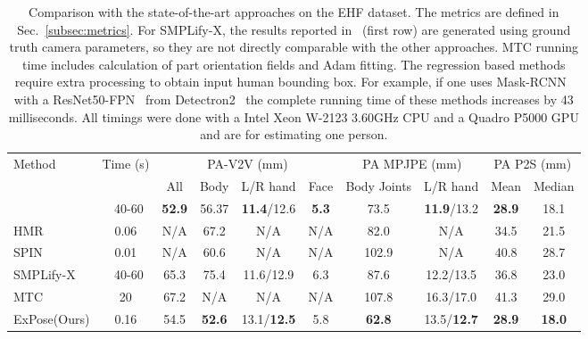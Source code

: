 \documentclass[runningheads]{llncs}
\newcommand{\modelname}{\mbox{ExPose}\xspace}
\newcommand{\na}{\mbox{N/A}\xspace}
\newcommand{\smplifyx}{\mbox{SMPLify-X}\xspace}
\newcommand{\fpn}{\mbox{FPN}\xspace}
\newcommand{\detectron}{\mbox{Detectron2}\xspace}
\newcommand{\adam}{\mbox{Adam}\xspace}
\newcommand{\resnet}{\mbox{ResNet50}\xspace}
\newcommand{\mtc}{\mbox{MTC}\xspace}
\begin{document}
\begin{table}[t!]
    \centering
    \caption{Comparison with the state-of-the-art approaches on the EHF dataset.
        The metrics are defined in Sec.~\ref{subsec:metrics}.
        For \smplifyx, the results reported in~\cite{Pavlakos_2019_CVPR} (first row)
        are generated using ground truth camera parameters,
        so they are not directly comparable with the other approaches.
        \mtc running time includes calculation of part orientation fields and \adam fitting.
        The regression based
        methods
        require extra processing to obtain input human bounding box. For example, if one uses Mask-RCNN~\cite{He_2017_ICCV} with a
        \resnet-\fpn~\cite{Lin_2017_CVPR} from \detectron~\cite{wu2019detectron2}
        the complete running time of these methods increases by 43 milliseconds.
        All timings were done with a Intel Xeon W-2123 3.60GHz CPU and
        a Quadro P5000 GPU and are for estimating one person.
    }
    \scriptsize
    \begin{tabular}{p{20ex}|c|c|c|c|c|c|c|c|c|}
        \toprule
        \multirow{2}{*}{Method} & \multirow{2}{*}{Time (s)} &
        \multicolumn{4}{c|}{PA-V2V (mm)} &
        \multicolumn{2}{c|}{PA MPJPE (mm)} &
        \multicolumn{2}{c|}{PA P2S (mm)}
        \\
         \cline{3-10}
        & & All & Body & L/R hand & Face & Body Joints & L/R hand & Mean & Median\\
        \midrule
        ~\cite{Pavlakos_2019_CVPR}
        & ~40-60 & \textbf{52.9} & 56.37 & \textbf{11.4}/12.6 & \textbf{5.3} &
        73.5 & \textbf{11.9}/13.2 & \textbf{28.9} & 18.1 \\
        \midrule
        HMR \cite{kanazawa_cvpr_2018} & 0.06 & \na  & 67.2 & \na & \na & 82.0 &
        \na & 34.5 & 21.5 \\
        SPIN \cite{Kolotouros_2019_ICCV} & 0.01  & \na  & 60.6 & \na & \na &
        102.9 & \na & 40.8 & 28.7  \\
        \smplifyx \cite{Pavlakos_2019_CVPR} & ~40-60 & 65.3 & 75.4 & 11.6/12.9 &
        6.3 & 87.6 & 12.2/13.5 & 36.8 & 23.0  \\
        \mtc~\cite{Xiang_2019_CVPR} & 20 & 67.2 & \na & \na & \na &107.8 & 16.3/17.0 & 41.3 & 29.0\\\modelname (Ours) & 0.16  & 54.5 & \textbf{52.6} & 13.1/\textbf{12.5} &
        5.8 & \textbf{62.8} & 13.5/\textbf{12.7} & \textbf{28.9} & \textbf{18.0}\\
        \bottomrule \end{tabular}
    \label{table:ehf}
\end{table}
\end{document}
